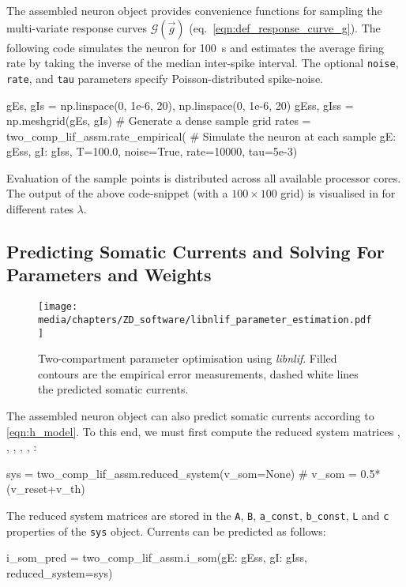 The assembled neuron object provides convenience functions for sampling the multi-variate response curves $\mathscr{G}(\vec g)$ (eq.~\ref{eqn:def_response_curve_g}).
The following code simulates the neuron for \SI{100}{\second} and estimates the average firing rate by taking the inverse of the median inter-spike interval.
The optional \texttt{noise}, \texttt{rate}, and \texttt{tau} parameters specify Poisson-distributed spike-noise.
\begin{pythoncode}
gEs, gIs = np.linspace(0, 1e-6, 20), np.linspace(0, 1e-6, 20) 
gEss, gIss = np.meshgrid(gEs, gIs)        # Generate a dense sample grid
rates = two_comp_lif_assm.rate_empirical( # Simulate the neuron at each sample
	{gE: gEss, gI: gIss}, T=100.0, noise=True, rate=10000, tau=5e-3)
\end{pythoncode}
Evaluation of the sample points is distributed across all available processor cores.
The output of the above code-snippet (with a $100 \times 100$ grid) is visualised in  for different rates $\lambda$.

\subsection{Predicting Somatic Currents and Solving For Parameters and Weights}

\begin{figure}
	\centering
	\texttt{[image: media/chapters/ZD\_software/libnlif\_parameter\_estimation.pdf]}%
	{\label{fig:libnlif_parameter_estimation_a}}%
	{\label{fig:libnlif_parameter_estimation_b}}%
	{\label{fig:libnlif_parameter_estimation_c}}%
	\caption[Two-compartment LIF parameter optimisation using \emph{libnlif}]{Two-compartment \LIF parameter optimisation using \emph{libnlif}.
	Filled contours are the empirical error measurements, dashed white lines the predicted somatic currents.}
	\label{fig:libnlif_parameter_estimation}
\end{figure}

The assembled neuron object can also predict somatic currents according to \cref{eqn:h_model}.
To this end, we must first compute the reduced system matrices \mrAp, \mrBp, \vrap, \vrbp, \mrL, \vrc:
\begin{pythoncode}
sys = two_comp_lif_assm.reduced_system(v_som=None) # v_som = 0.5*(v_reset+v_th)
\end{pythoncode}
The reduced system matrices are stored in the \texttt{A}, \texttt{B}, \texttt{a\_const}, \texttt{b\_const}, \texttt{L} and \texttt{c} properties of the \texttt{sys} object.
Currents can be predicted as follows:
\begin{pythoncode}
i_som_pred = two_comp_lif_assm.i_som({gE: gEss, gI: gIss}, reduced_system=sys)
\end{pythoncode}

